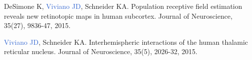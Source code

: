 \documentclass[a4paper,11pt,oneside]{book}
\newcommand\paper[1]{
    #1\\
    \vspace{3.5mm}
}
\begin{document}
\begin{flushleft}
\paper{DeSimone K, \textcolor{highlight}{Viviano JD}, Schneider KA. Population receptive field estimation reveals new retinotopic maps in human subcortex. Journal of Neuroscience, 35(27), 9836-47, 2015.}

\paper{\textcolor{highlight}{Viviano JD}, Schneider KA. Interhemispheric interactions of the human thalamic reticular nucleus. Journal of Neuroscience, 35(5), 2026-32, 2015.}









\end{flushleft}
\end{document}
